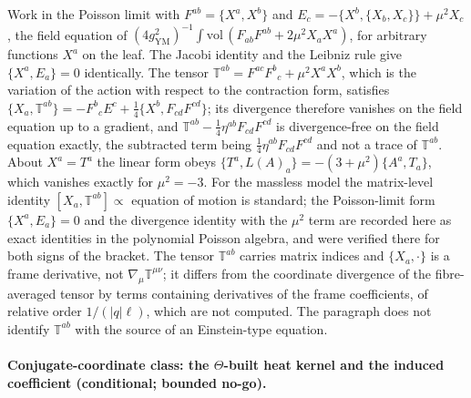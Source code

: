 Work in the Poisson limit with \(F^{ab}=\{X^a,X^b\}\) and \(E_c=-\{X^b,\{X_b,X_c\}\}+\mu^2X_c\), the field equation of \((4g_{\mathrm{YM}}^2)^{-1}\int\mathrm{vol}\,(F_{ab}F^{ab}+2\mu^2X_aX^a)\), for arbitrary functions \(X^a\) on the leaf. The Jacobi identity and the Leibniz rule give \(\{X^a,E_a\}=0\) identically. The tensor \(\mathbb T^{ab}=F^{ac}F^{b}{}_{c}+\mu^2X^aX^b\), which is the variation of the action with respect to the contraction form, satisfies \(\{X_a,\mathbb T^{ab}\}=-F^{b}{}_{c}E^c+\tfrac14\{X^b,F_{cd}F^{cd}\}\); its divergence therefore vanishes on the field equation up to a gradient, and \(\mathbb T^{ab}-\tfrac14\eta^{ab}F_{cd}F^{cd}\) is divergence-free on the field equation exactly, the subtracted term being \(\tfrac14\eta^{ab}F_{cd}F^{cd}\) and not a trace of \(\mathbb T^{ab}\). About \(X^a=T^a\) the linear form obeys \(\{T^a,L(A)_a\}=-(3+\mu^2)\{A^a,T_a\}\), which vanishes exactly for \(\mu^2=-3\). For the massless model the matrix-level identity \([X_a,\mathbb T^{ab}]\propto\) equation of motion is standard; the Poisson-limit form \(\{X^a,E_a\}=0\) and the divergence identity with the \(\mu^2\) term are recorded here as exact identities in the polynomial Poisson algebra, and were verified there for both signs of the bracket. The tensor \(\mathbb T^{ab}\) carries matrix indices and \(\{X_a,\cdot\}\) is a frame derivative, not \(\nabla_\mu\mathbb T^{\mu\nu}\); it differs from the coordinate divergence of the fibre-averaged tensor by terms containing derivatives of the frame coefficients, of relative order \(1/(|q|\ell)\), which are not computed. The paragraph does not identify \(\mathbb T^{ab}\) with the source of an Einstein-type equation.





\paragraph{Conjugate-coordinate class: the \(\Theta\)-built heat kernel and the induced coefficient (conditional; bounded no-go).} \label{detail:sec-F-paragraphconjugatecoordinatecl-33}

